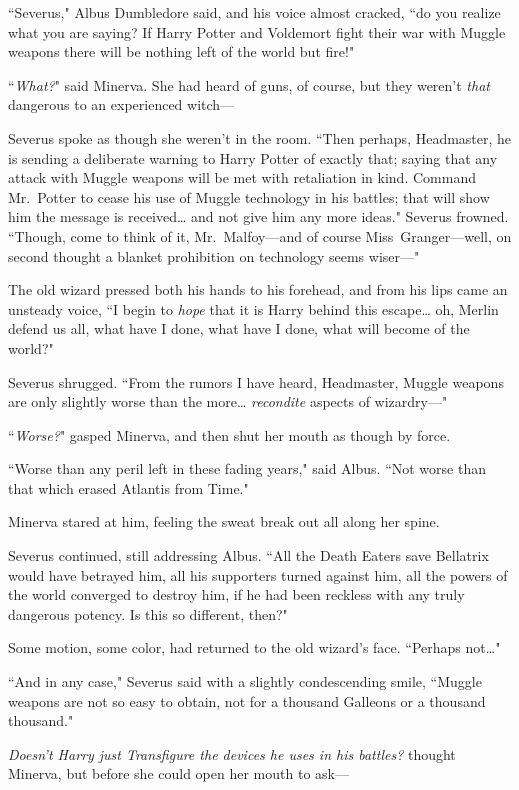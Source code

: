 ``Severus," Albus Dumbledore said, and his voice almost cracked, ``do you realize what you are saying? If Harry Potter and Voldemort fight their war with Muggle weapons there will be nothing left of the world but fire!"

``\emph{What?}" said Minerva. She had heard of guns, of course, but they weren't \emph{that} dangerous to an experienced witch---

Severus spoke as though she weren't in the room. ``Then perhaps, Headmaster, he is sending a deliberate warning to Harry Potter of exactly that; saying that any attack with Muggle weapons will be met with retaliation in kind. Command Mr.~Potter to cease his use of Muggle technology in his battles; that will show him the message is received{\ldots} and not give him any more ideas." Severus frowned. ``Though, come to think of it, Mr.~Malfoy---and of course Miss~Granger---well, on second thought a blanket prohibition on technology seems wiser---"

The old wizard pressed both his hands to his forehead, and from his lips came an unsteady voice, ``I begin to \emph{hope} that it is Harry behind this escape{\ldots} oh, Merlin defend us all, what have I done, what have I done, what will become of the world?"

Severus shrugged. ``From the rumors I have heard, Headmaster, Muggle weapons are only slightly worse than the more{\ldots} \emph{recondite} aspects of wizardry---"

``\emph{Worse?}" gasped Minerva, and then shut her mouth as though by force.

``Worse than any peril left in these fading years," said Albus. ``Not worse than that which erased Atlantis from Time."

Minerva stared at him, feeling the sweat break out all along her spine.

Severus continued, still addressing Albus. ``All the Death Eaters save Bellatrix would have betrayed him, all his supporters turned against him, all the powers of the world converged to destroy him, if he had been reckless with any truly dangerous potency. Is this so different, then?"

Some motion, some color, had returned to the old wizard's face. ``Perhaps not{\ldots}"

``And in any case," Severus said with a slightly condescending smile, ``Muggle weapons are not so easy to obtain, not for a thousand Galleons or a thousand thousand."

\emph{Doesn't Harry just Transfigure the devices he uses in his battles?} thought Minerva, but before she could open her mouth to ask---

